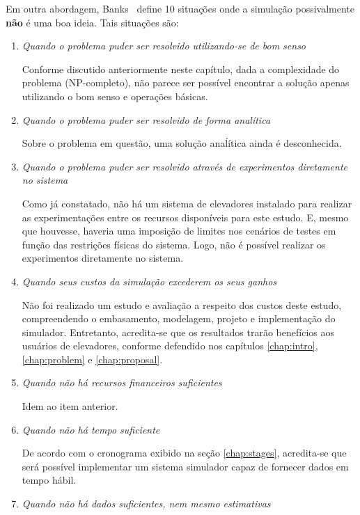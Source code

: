 Em outra abordagem, Banks~\cite{BanksGibson} define 10 situações onde a
simulação possivalmente \textbf{não} é uma boa ideia. Tais situações são:

\begin{enumerate}
\item \textit{Quando o problema puder ser resolvido utilizando-se de bom senso}

Conforme discutido anteriormente neste capítulo, dada a complexidade do problema
(NP-completo), não parece ser possível encontrar a solução apenas utilizando o
bom senso e operações básicas.

\item \textit{Quando o problema puder ser resolvido de forma analítica}

Sobre o problema em questão, uma solução anaĺítica ainda é desconhecida.

\item \textit{Quando o problema puder ser resolvido através de experimentos
diretamente no sistema}

Como já constatado, não há um sistema de elevadores instalado para realizar as
experimentações entre os recursos disponíveis para este estudo. E, mesmo que
houvesse, haveria uma imposição de limites nos cenários de testes em função das
restrições físicas do sistema. Logo, não é possível realizar os experimentos
diretamente no sistema.

\item \textit{Quando seus custos da simulação excederem os seus ganhos}

Não foi realizado um estudo e avaliação a respeito dos custos deste estudo,
compreendendo o embasamento, modelagem, projeto e implementação do simulador.
Entretanto, acredita-se que os resultados trarão benefícios aos usuários de
elevadores, conforme defendido nos capítulos \ref{chap:intro},
\ref{chap:problem} e \ref{chap:proposal}.

\item \textit{Quando não há recursos financeiros suficientes}

Idem ao item anterior.

\item \textit{Quando não há tempo suficiente}

De acordo com o cronograma exibido na seção \ref{chap:stages}, acredita-se que
será possível implementar um sistema simulador capaz de fornecer dados em tempo
hábil.

\item \textit{Quando não há dados suficientes, nem mesmo estimativas}


\end{enumerate}
